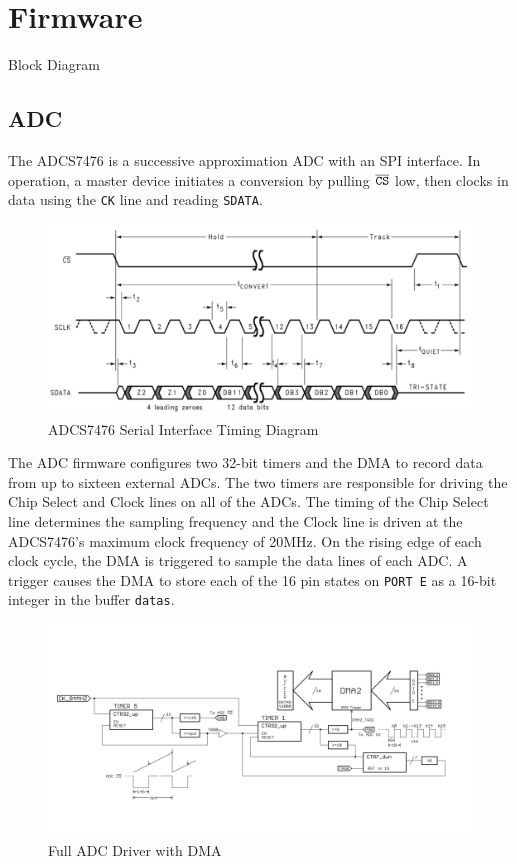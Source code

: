 \documentclass[11pt,twoside]{mitthesis}
\begin{document}
\chapter{Firmware}
Block Diagram

\section{ADC}
The ADCS7476 is a successive approximation ADC with an SPI interface.  
In operation, a master device initiates a conversion by pulling $\overline{\mbox{\texttt{CS}}}$ low, then clocks in data using the \texttt{CK} line and reading \texttt{SDATA}.

\begin{figure}[H]
	\label{fig:adc-timing}
  \begin{center}
      \includegraphics[width=\textwidth]{../adc-timing.png}
      \caption{ADCS7476 Serial Interface Timing Diagram}
  \end{center}
\end{figure}

The ADC firmware configures two 32-bit timers and the DMA to record data from up to sixteen external ADCs.
The two timers are responsible for driving the Chip Select and Clock lines on all of the ADCs.
The timing of the Chip Select line determines the sampling frequency and the Clock line is driven at the ADCS7476's maximum clock frequency of 20MHz.
On the rising edge of each clock cycle, the DMA is triggered to sample the data lines of each ADC.
A trigger causes the DMA to store each of the 16 pin states on \texttt{PORT E} as a 16-bit integer in the buffer \texttt{datas}.

\begin{figure}[H]
  \begin{center}
      \includegraphics[width=1\textwidth]{../ADC.png}
      \caption{Full ADC Driver with DMA}
  \end{center}
\end{figure}
\end{document}
